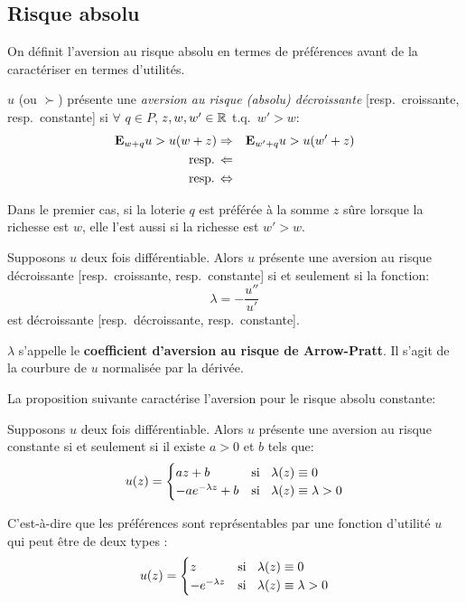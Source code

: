 \subsection{Risque absolu}
On définit l'aversion au risque absolu en termes de préférences
avant de la caractériser en termes d'utilités.

\begin{definition}
$u$ (ou $\succ$) pr\'esente une {\em aversion au risque (absolu)
d\'ecroissante} [resp.\, croissante, resp.\, constante] si
$\forall$ $q\in P$, $z,w,w' \in \mathbb R$ t.q.\, $w'>w$:
\begin{eqnarray*}
\mathbf{E}_{w+q}u>u(w+z) &\Rightarrow& \mathbf{E}_{w'+q}u>u(w'+z)\\
\mbox{resp.\,} &\Leftarrow& \\
\mbox{resp.\,} &\Leftrightarrow&
\end{eqnarray*}
\end{definition}

Dans le premier cas, si la loterie $q$ est pr\'ef\'er\'ee \`a la
somme $z$ s\^ure lorsque la richesse est $w$, elle l'est aussi si
la richesse est $w'>w$.


\begin{proposition} Supposons $u$ deux fois diff\'erentiable.
Alors $u$ pr\'esente une aversion au risque d\'ecroissante
[resp.\, croissante, resp.\, constante] si et seulement si la
fonction:
$$
\lambda = - \frac{u''}{u'}
$$
est d\'ecroissante [resp.\, d\'ecroissante, resp.\, constante]. \\
\end{proposition}

$\lambda$ s'appelle le {\bf coefficient d'aversion au risque de
Arrow-Pratt}. Il s'agit de la courbure de $u$ normalis\'ee par la
d\'eriv\'ee.


La proposition suivante caractérise l'aversion pour le risque
absolu constante:

\begin{proposition} Supposons $u$ deux fois diff\'erentiable. Alors
$u$ pr\'esente une aversion au risque constante si et seulement si
il existe $a>0$ et $b$ tels que:
$$
u(z)=
\begin{cases}
  az+b &\mbox{si }\;\; \lambda(z)\equiv0\cr
  -ae^{-\lambda z}+b  &\mbox{si }\;\; \lambda(z)\equiv\lambda>0
\end{cases}
$$
\end{proposition}

C'est-à-dire que les préférences sont représentables par une
fonction d'utilité $u$ qui peut être de deux types :
$$
u(z)=
\begin{cases}
  z &\mbox{si }\;\; \lambda(z)\equiv0\cr
  -e^{-\lambda z}  &\mbox{si }\;\; \lambda(z)\equiv\lambda>0
\end{cases}
$$

